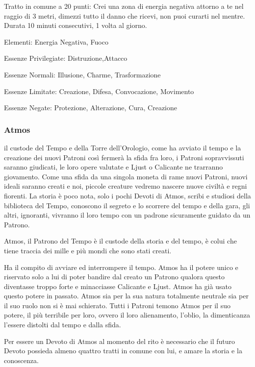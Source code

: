 \documentclass[a4paper,11pt,twoside,openany]{book}
\begin{document}
{Tratto in comune a 20 punti: Crei una zona di energia negativa attorno a te nel raggio di 3 metri, dimezzi tutto il danno che ricevi, non puoi curarti nel mentre. Durata 10 minuti consecutivi, 1 volta al giorno.

\bigskip

Elementi: Energia Negativa, Fuoco

\bigskip

Essenze Privilegiate: Distruzione,Attacco

Essenze Normali: Illusione, Charme, Trasformazione

Essenze Limitate: Creazione, Difesa, Convocazione, Movimento

Essenze Negate: Protezione, Alterazione, Cura, Creazione

\subsubsection{Atmos}

\label{atmos}

il custode del Tempo e della Torre dell'Orologio, come ha avviato il tempo e la creazione dei nuovi Patroni così fermerà la sfida fra loro, i Patroni sopravvissuti saranno giudicati, le loro opere valutate e Ljust o Calicante ne trarranno giovamento. Come una sfida da una singola moneta di rame nuovi Patroni, nuovi ideali saranno creati e noi, piccole creature vedremo nascere nuove civiltà e regni fiorenti. La storia è poco nota, solo i pochi Devoti di Atmos, scribi e studiosi della biblioteca del Tempo, conoscono il segreto e lo scorrere del tempo e della gara, gli altri, ignoranti, vivranno il loro tempo con un padrone sicuramente guidato da un Patrono.

Atmos, il Patrono del Tempo è il custode della storia e del tempo, è colui che tiene traccia dei mille e più mondi che sono stati creati.

Ha il compito di avviare ed interrompere il tempo. Atmos ha il potere unico e riservato solo a lui di poter bandire dal creato un Patrono qualora questo diventasse troppo forte e minacciasse Calicante e Ljust. Atmos ha già usato questo potere in passato. Atmos sia per la sua natura totalmente neutrale sia per il suo ruolo non si è mai schierato. Tutti i Patroni temono Atmos per il suo potere, il più terribile per loro, ovvero il loro alienamento, l'oblio, la dimenticanza l'essere distolti dal tempo e dalla sfida.

Per essere un Devoto di Atmos al momento del rito è necessario che il futuro Devoto possieda almeno quattro tratti in comune con lui, e amare la storia e la conoscenza.

}
\end{document}
